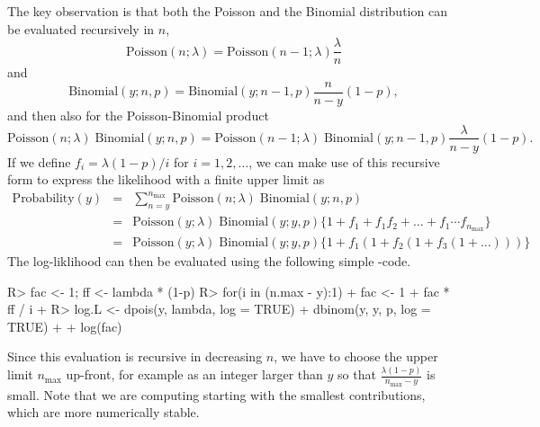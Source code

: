 \documentclass[article]{jss}
\begin{document}
The key observation is that both the Poisson and the Binomial distribution can be evaluated recursively in $n$,
\begin{displaymath}
    \text{Poisson}(n; \lambda) = \text{Poisson}(n-1; \lambda) \frac{\lambda}{n}
\end{displaymath}
and
\begin{displaymath}
    \text{Binomial}(y; n, p) = \text{Binomial}(y; n-1, p) \frac{n}{n-y}(1-p),
\end{displaymath}
and then also for the Poisson-Binomial product
\begin{displaymath}
    \text{Poisson}(n ; \lambda) \; \text{Binomial}(y;  n, p)
    =
    \text{Poisson}(n-1; \lambda) \; \text{Binomial}(y; n-1, p)
    \frac{\lambda}{n-y}(1-p).
\end{displaymath}
If we define $f_i = \lambda(1-p)/i$ for $i=1, 2, \ldots$, we can make use of this recursive form to express the likelihood with a finite upper limit as
\begin{eqnarray}
    \text{Probability}(y) &=& \sum_{n = y}^{n_{\text{max}}}
                       \text{Poisson}(n ; \lambda)\;
                      \text{Binomial}(y;  n, p) \nonumber\\
                   &=& \text{Poisson}(y; \lambda)\; \text{Binomial}(y; y, p)
                       \Big\{ 1 + f_1 + f_1f_2 +
                    \ldots
                      +f_1\cdots f_{n_\text{max}}
                       \Big\} \nonumber\\
                   &=& \text{Poisson}(y; \lambda)\; \text{Binomial}(y; y, p)
                       \Big\{ 1 + f_1(1+f_2(1+f_3(1+ \dots)))\Big\}\nonumber
\end{eqnarray}
The log-liklihood can then be evaluated using the following simple -code.
\begin{CodeInput}
R> fac <- 1; ff <- lambda * (1-p)
R> for(i in (n.max - y):1){
+    fac <- 1 + fac * ff / i
+  } 
R> log.L <- dpois(y, lambda, log = TRUE) + dbinom(y, y, p, log = TRUE) + 
+           log(fac)
\end{CodeInput}
Since this evaluation is recursive in decreasing $n$, we have to choose the upper limit $n_\text{max}$ up-front, for example as an integer larger than $y$ so that $\frac{\lambda (1-p)}{n_\text{max}-y}$ is small. Note that we are computing  starting with the smallest contributions, which are more numerically stable.
\end{document}
